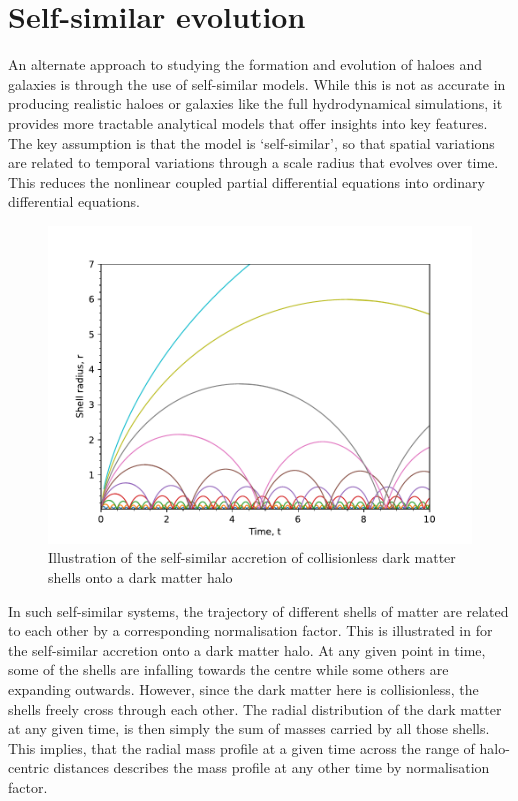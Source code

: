 

\section{Self-similar evolution}

An alternate approach to studying the formation and evolution of haloes and galaxies is through the use of self-similar models. While this is not as accurate in producing realistic haloes or galaxies like the full hydrodynamical simulations, it provides more tractable analytical models that offer insights into key features. The key assumption is that the model is `self-similar', so that spatial variations are related to temporal variations through a scale radius that evolves over time. This reduces the nonlinear coupled partial differential equations into ordinary differential equations.

\begin{figure}
\centering
\includegraphics[width=0.8\linewidth]{Figures/illustrate_self-sim_DM_shells.pdf}
\caption{Illustration of the self-similar accretion of collisionless dark matter shells onto a dark matter halo}
\label{fig:self_sim_illustrate}
\end{figure}

In such self-similar systems, the trajectory of different shells of matter are related to each other by a corresponding normalisation factor. This is illustrated in  for the self-similar accretion onto a dark matter halo. At any given point in time, some of the shells are infalling towards the centre while some others are expanding outwards. However, since the dark matter here is collisionless, the shells freely cross through each other. The radial distribution of the dark matter at any given time, is then simply the sum of masses carried by all those shells. This implies, that the radial mass profile at a given time across the range of halo-centric distances describes the mass profile at any other time by normalisation factor.

